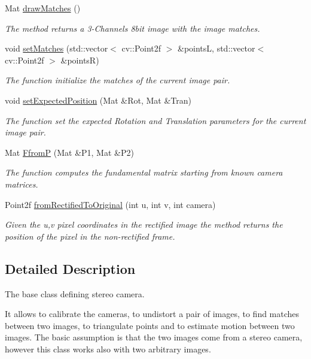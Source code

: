 \begin{DoxyCompactItemize}
Mat \hyperlink{classStereoCamera_a6580ff03c7cec5c385ec717f9c018e21}{draw\+Matches} ()
\begin{DoxyCompactList}\small\item\em The method returns a 3-\/\+Channels 8bit image with the image matches. \end{DoxyCompactList}\item 
void \hyperlink{classStereoCamera_ae683fafa11ea73e4b4c278402be259b6}{set\+Matches} (std\+::vector$<$ cv\+::\+Point2f $>$ \&pointsL, std\+::vector$<$ cv\+::\+Point2f $>$ \&pointsR)
\begin{DoxyCompactList}\small\item\em The function initialize the matches of the current image pair. \end{DoxyCompactList}\item 
void \hyperlink{classStereoCamera_a9ecb303d7b36eaf5f086d8ddebd29b95}{set\+Expected\+Position} (Mat \&Rot, Mat \&Tran)
\begin{DoxyCompactList}\small\item\em The function set the expected Rotation and Translation parameters for the current image pair. \end{DoxyCompactList}\item 
Mat \hyperlink{classStereoCamera_a3fe4e87322f8644cd21ce06e8522c815}{FfromP} (Mat \&P1, Mat \&P2)
\begin{DoxyCompactList}\small\item\em The function computes the fundamental matrix starting from known camera matrices. \end{DoxyCompactList}\item 
Point2f \hyperlink{classStereoCamera_a3d8fde0cbd4604085b883f22cc606c01}{from\+Rectified\+To\+Original} (int u, int v, int camera)
\begin{DoxyCompactList}\small\item\em Given the u,v pixel coordinates in the rectified image the method returns the position of the pixel in the non-\/rectified frame. \end{DoxyCompactList}\end{DoxyCompactItemize}


\subsection{Detailed Description}
The base class defining stereo camera. 

It allows to calibrate the cameras, to undistort a pair of images, to find matches between two images, to triangulate points and to estimate motion between two images. The basic assumption is that the two images come from a stereo camera, however this class works also with two arbitrary images. 

